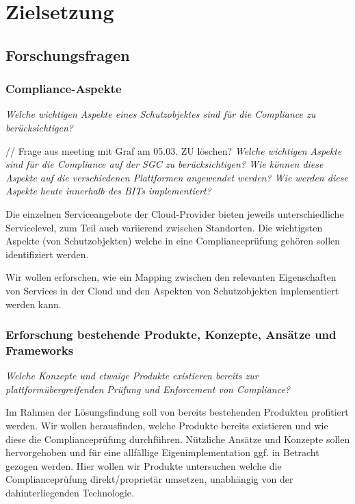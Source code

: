 \section{Zielsetzung}

\subsection{Forschungsfragen}


\subsubsection{Compliance-Aspekte}

\textit{Welche wichtigen Aspekte eines Schutzobjektes sind für die Compliance zu berücksichtigen?}

// Frage aus meeting mit Graf am 05.03. ZU löschen? \textit{Welche wichtigen Aspekte sind für die Compliance auf der SGC zu berücksichtigen?
Wie können diese Aspekte auf die verschiedenen Plattformen angewendet werden? Wie werden diese Aspekte heute innerhalb des BITs implementiert?}


Die einzelnen Serviceangebote der Cloud-Provider bieten jeweils unterschiedliche Servicelevel, zum Teil auch variierend zwischen Standorten. Die wichtigsten Aspekte (von Schutzobjekten) welche in eine Complianceprüfung gehören sollen identifiziert werden.

Wir wollen erforschen, wie ein Mapping zwischen den relevanten Eigenschaften von Services in der Cloud und den Aspekten von Schutzobjekten implementiert werden kann.


\subsubsection{Erforschung bestehende Produkte, Konzepte, Ansätze und Frameworks}

\textit{Welche Konzepte und etwaige Produkte existieren bereits zur plattformübergreifenden Prüfung und Enforcement von Compliance?}

Im Rahmen der Lösungsfindung soll von bereits bestehenden Produkten profitiert werden. Wir wollen herausfinden, welche Produkte bereits existieren und wie diese die Complianceprüfung durchführen.
Nützliche Ansätze und Konzepte sollen hervorgehoben und für eine allfällige Eigenimplementation ggf. in Betracht gezogen werden. Hier wollen wir Produkte untersuchen welche die Complianceprüfung direkt/proprietär umsetzen, unabhängig von der dahinterliegenden Technologie.

